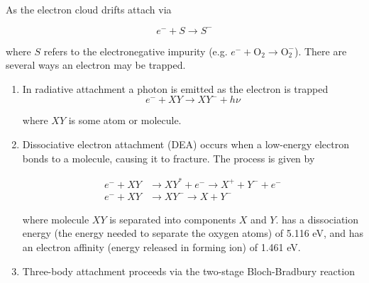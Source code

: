 As the electron cloud drifts \electron attach via

\vspace{-10pt}

\begin{equation}
e^{-} + S \rightarrow S^{-}
\label{eq:impurity_attach}
\end{equation}

\noindent where $S$ refers to the electronegative impurity (e.g. $e^- + \mathrm{O_2} \rightarrow \mathrm{O_2^-}$).  There are several
ways an electron may be trapped.

\begin{enumerate}
\item In radiative attachment a photon is emitted as the electron is trapped
\vspace{-5pt}
\begin{equation}
e^- + XY \rightarrow XY^- + h \nu
\end{equation}

\vspace{-10pt}

\noindent where $XY$ is some atom or molecule.

\item Dissociative electron attachment (DEA) occurs when a low-energy electron bonds to a molecule, causing it to fracture.  The process
is given by

\vspace{-25pt}

\begin{subequations}
\begin{align}
e^- + XY &\rightarrow XY^* + e^- \rightarrow X^+ + Y^- + e^- \\
e^- + XY &\rightarrow XY^- \rightarrow X + Y^-
\end{align}
\end{subequations}

\vspace{-5pt}

\noindent where molecule $XY$ is separated into components $X$ and $Y$.   has a dissociation energy (the energy needed to
separate the oxygen atoms) of 5.116 eV, and  has an electron affinity (energy released in forming ion) of 1.461 eV.

\item Three-body attachment proceeds via the two-stage Bloch-Bradbury reaction 

\vspace{-30pt}


\end{enumerate}
